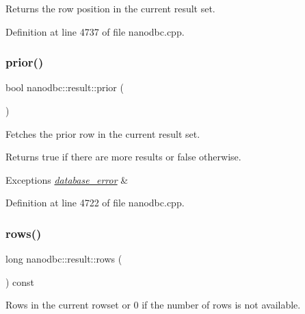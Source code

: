 Returns the row position in the current result set. 



Definition at line 4737 of file nanodbc.\+cpp.

\mbox{\label{classnanodbc_1_1result_afd0b71a0bfe3e184f3b9a1caf8f17058}} 
\subsubsection{\texorpdfstring{prior()}{prior()}}
{\footnotesize\ttfamily bool nanodbc\+::result\+::prior (\begin{DoxyParamCaption}{ }\end{DoxyParamCaption})}



Fetches the prior row in the current result set. 

\begin{DoxyReturn}{Returns}
true if there are more results or false otherwise. 
\end{DoxyReturn}

\begin{DoxyExceptions}{Exceptions}
{\em \mbox{\hyperlink{classnanodbc_1_1database__error}{database\+\_\+error}}} & \\
\hline
\end{DoxyExceptions}


Definition at line 4722 of file nanodbc.\+cpp.

\mbox{\label{classnanodbc_1_1result_a7138ae9ec911fd4694a5c81ef902db89}} 
\subsubsection{\texorpdfstring{rows()}{rows()}}
{\footnotesize\ttfamily long nanodbc\+::result\+::rows (\begin{DoxyParamCaption}{ }\end{DoxyParamCaption}) const\hspace{0.3cm}{\ttfamily [noexcept]}}



Rows in the current rowset or 0 if the number of rows is not available. 



